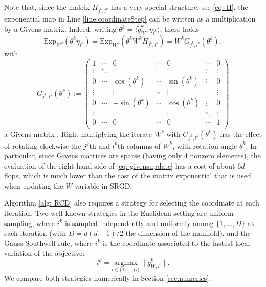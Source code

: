\documentclass{article}
\def \argmax {\mathrm{argmax}}
\begin{document}
Note that, since the matrix $H_{j^k, l^k}$ has a very special structure, see \eqref{eq: H}, the exponential map in Line \ref{line:coordinateStep} can be written as a multiplication by a Givens matrix. Indeed, writing $\theta^k = \langle \tilde{g}_W^k, \eta_{i^k} \rangle$, there holds 
\begin{equation} \label{eq: givensupdate}
    \mathrm{Exp}_{W^k}(\theta^k \eta_{i^k}) = \mathrm{Exp}_{W^k}(\theta^k W^k H_{j^k,l^k}) = W^k G_{j^k,l^k}(\theta^k),
\end{equation}
with 
\begin{equation}
    G_{j^k,l^k}(\theta^k) := \begin{pmatrix}  
    1 &\cdots &0 &\cdots &0 &\cdots &0 \\  
    \vdots & \ddots & \vdots &\vdots & \vdots &\vdots & \vdots \\
    0 &  \cdots & \cos(\theta^k)& \cdots  & \sin(\theta^k) &\vdots & 0 \\
    \vdots &  & \vdots & \ddots  & \vdots  & & \vdots \\
    0 &  \cdots & -\sin(\theta^k)& \cdots  & \cos(\theta^k) &\vdots & 0 \\
    \vdots &   & \vdots &  & \vdots &\ddots & \vdots \\
    0 &  \cdots & 0& \cdots  & 0 &\cdots & 1 \\
    \end{pmatrix}
\end{equation}
a Givens matrix \cite{Shalit2014}. Right-multiplying the iterate $W^k$ with $G_{j^k,l^k}(\theta^k)$ has the effect of rotating clockwise the $j^k$th and $l^k$th columns of $W^k$, with rotation angle $\theta^k$. In particular, since Givens matrices are sparse (having only 4 nonzero elements), the evaluation of the right-hand side of \eqref{eq: givensupdate} has a cost of about $6d$ flops, which is much lower than the cost of the matrix exponential that is used when updating the $W$ variable in SRGD.

Algorithm \ref{alg: RCD} also requires a strategy for selecting the coordinate at each iteration. Two well-known strategies in the Euclidean setting are uniform sampling, where $i^k$ is sampled independently and uniformly among $\{1, \dots, D\}$ at each iteration (with $D = d(d-1)/2$ the dimension of the manifold), and the Gauss-Southwell rule, where $i^k$ is the coordinate associated to the fastest local variation of the objective:  
\begin{equation} \label{eq: GS}
    i^k = \underset{i \in \{1, \dots, D\}}{ \argmax} \| g_{W,i}^k \|.
\end{equation}
We compare both strategies numerically in Section \ref{sec:numerics}.
\end{document}
